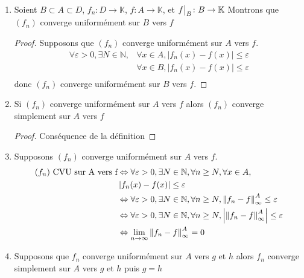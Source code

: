 \documentclass[11pt,hidelinks]{book}
\theoremstyle{mytheoremstyle}
\theoremstyle{mytheoremstyle}
\theoremstyle{mytheoremstyle}
\theoremstyle{mytheoremstyle}
\theoremstyle{mytheoremstyle}
\theoremstyle{mytheoremstyle}
\theoremstyle{mytheoremstyle}
\theoremstyle{mytheoremstyle}
\theoremstyle{myproblemstyle}
\def\mbb#1{\mathbb{#1}}
\def\bN{\mbb{N}}
\def\bK{\mbb{K}}
\def\ln{\lim_{n \to \infty}}
\newcommand{\func}[3]{#1\colon#2\to#3}
\newcommand{\cvs}[2]{converge simplement sur $#1$ vers $#2$}
\newcommand{\cvu}[2]{converge uniformément sur $#1$ vers $#2$}
\newcommand\restr[2]{{%
  \left.\kern-\nulldelimiterspace %
  #1 %
  \vphantom{\big|} %
  \right|_{#2} %
  }}
\begin{document}
\begin{adjustwidth}{-2em}{-1em}
\begin{prop}
    \begin{enumerate}
    \item Soient $B \subset A \subset D$, $\func{f_n}{D}{\bK}$, $\func{f}{A}{\bK}$, et $\func{\restr{f}{B}}{B}{\bK}$
    Montrons que $(f_n)$ \cvu{B}{f}
    \begin{proof}
    Supposons que $(f_n)$ \cvu{A}{f}.
    \begin{align*}
        \forall \varepsilon > 0, \exists N \in \bN, &\forall x \in A, \left| f_n(x) - f(x) \right| \leq \varepsilon \\
                                                    &\forall x \in B, \left| f_n(x) - f(x) \right| \leq \varepsilon \\
        \end{align*}       
    donc $(f_n)$ \cvu{B}{f}.
    \end{proof}

    \item Si $(f_n)$ \cvu{A}{f} alors $(f_n)$ \cvs{A}{f}
    \begin{proof}
        Conséquence de la définition
    \end{proof}
    
    \item Supposons $(f_n)$ \cvu{A}{f}. 
    \begin{align*}
        (f_n) \text{ CVU sur A vers f} &\Leftrightarrow \forall \varepsilon > 0, \exists N \in \bN, \forall n \geq N, \forall x \in A, \\
                                       &\left| f_n(x) - f(x) \right| \leq \varepsilon \\
                                       &\Leftrightarrow \forall \varepsilon > 0, \exists N \in \bN, \forall n \geq N, \norm{f_n - f}^{A}_{\infty} \leq \varepsilon \\
                                       &\Leftrightarrow \forall \varepsilon > 0, \exists N \in \bN, \forall n \geq N, \abs{\norm{f_n - f}^{A}_{\infty}} \leq \varepsilon \\
                                       &\Leftrightarrow \ln\norm{f_n - f}^{A}_{\infty} = 0 \\
    \end{align*}   

    \item Supposons que $f_n$ \cvu{A}{g} et $h$ alors $f_n$ \cvs{A}{g} et $h$ puis $g=h$
    \end{enumerate}
\end{prop}
\end{adjustwidth}
\end{document}
